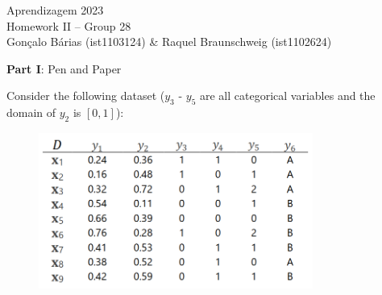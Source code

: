 \documentclass[12pt]{article}
\begin{document}
\begin{center}
  \large{Aprendizagem 2023}\\
  Homework II -- Group 28\\
  \vskip 0.3cm
  Gonçalo Bárias (ist1103124) \& Raquel Braunschweig (ist1102624)\vskip 1cm

  \large{\textbf{Part I}: Pen and Paper}\normalsize
\end{center}

\noindent Consider the following dataset ($y_3$ - $y_5$ are all categorical variables and the domain of $y_2$ is $[0,1]$):

\begin{figure}[H]
  \centering
  \includegraphics[width=9cm]{./assets/dataset_d.png}
  \label{fig:PartI-dataset-d}
\end{figure}
\end{document}
